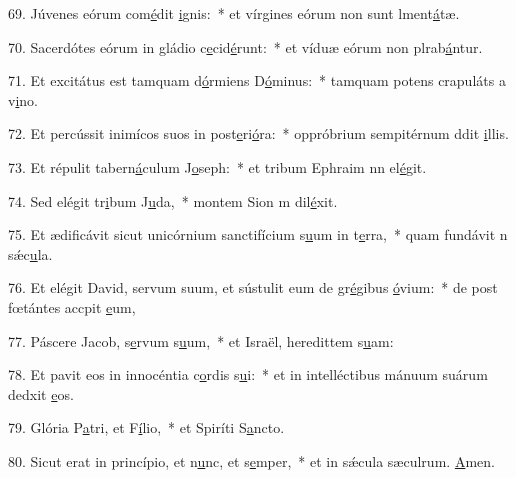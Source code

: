 69. Júvenes eórum com\uline{é}dit \uline{i}gnis:~* et vírgines eórum non sunt lment\uline{á}tæ.\par 
70. Sacerdótes eórum in gládio c\uline{e}cid\uline{é}runt:~* et víduæ eórum non plrab\uline{á}ntur.\par 
71. Et excitátus est tamquam d\uline{ó}rmiens D\uline{ó}minus:~* tamquam potens crapuláts a v\uline{i}no.\par 
72. Et percússit inimícos suos in post\uline{e}ri\uline{ó}ra:~* oppróbrium sempitérnum ddit \uline{i}llis.\par 
73. Et répulit tabern\uline{á}culum J\uline{o}seph:~* et tribum Ephraim nn el\uline{é}git.\par 
74. Sed elégit tr\uline{i}bum J\uline{u}da,~* montem Sion m dil\uline{é}xit.\par 
75. Et ædificávit sicut unicórnium sanctifícium s\uline{u}um in t\uline{e}rra,~* quam fundávit n sǽc\uline{u}la.\par 
76. Et elégit David, servum suum, et sústulit eum de gr\uline{é}gibus \uline{ó}vium:~* de post fœtántes accpit \uline{e}um,\par 
77. Páscere Jacob, s\uline{e}rvum s\uline{u}um,~* et Israël, heredittem s\uline{u}am:\par 
78. Et pavit eos in innocéntia c\uline{o}rdis s\uline{u}i:~* et in intelléctibus mánuum suárum dedxit \uline{e}os.\par 
79. Glória P\uline{a}tri, et F\uline{í}lio,~* et Spiríti S\uline{a}ncto.\par 
80. Sicut erat in princípio, et n\uline{u}nc, et s\uline{e}mper,~* et in sǽcula sæculrum. \uline{A}men.\par 
